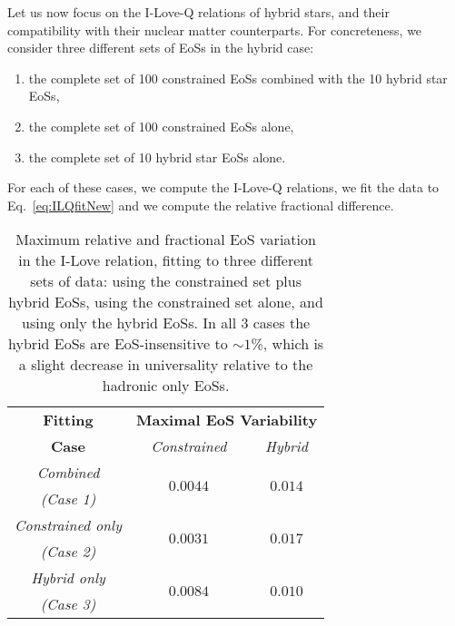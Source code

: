 \documentclass[prd,twocolumn,nofootinbib,superscriptaddress,amsmath,amssymb]{revtex4-1}
\begin{document}
Let us now focus on the I-Love-Q relations of hybrid stars, and their compatibility with their nuclear matter counterparts. For concreteness, we consider three different sets of EoSs in the hybrid case:
\begin{enumerate}
\item the complete set of 100 constrained EoSs combined with the 10 hybrid star EoSs,
\item the complete set of 100 constrained EoSs alone,
\item the complete set of 10 hybrid star EoSs alone.
\end{enumerate}
For each of these cases, we compute the I-Love-Q relations, we fit the data to Eq.~\eqref{eq:ILQfitNew} and we compute the relative fractional difference. 

\begin{table}[htb]
\centering
\begin{tabular}{ c  || c c } 
 \hline
 \hline
 \textbf{Fitting} & \multicolumn{2}{c}{\textbf{Maximal EoS Variability}} \\
 \cline{2-3}
 \textbf{Case} &  \multicolumn{1}{c|}{\emph{Constrained}} & \emph{Hybrid}\\
 \hline
 \emph{Combined} &  \multirow{2}{*}{$0.0044$} & \multirow{2}{*}{$0.014$}\\
 \emph{(Case 1)} & &\\
 \cline{1-1}
 \emph{Constrained only} & \multirow{2}{*}{$0.0031$} & \multirow{2}{*}{$0.017$}\\
  \emph{(Case 2)} & &\\
  \cline{1-1}
 \emph{Hybrid only} & \multirow{2}{*}{$0.0084$} & \multirow{2}{*}{$0.010$}\\
  \emph{(Case 3)} & &\\
  \cline{1-1}
\hline
\hline
\end{tabular}
\caption{
Maximum relative and fractional EoS variation in the I-Love relation, fitting to three different sets of data: using the constrained set plus hybrid EoSs, using the constrained set alone, and using only the hybrid EoSs. In all 3 cases the hybrid EoSs are EoS-insensitive to $\sim1$\%, which is a slight decrease in universality relative to the hadronic only EoSs.
}\label{tab:hybridCompare}
\end{table}
\end{document}
